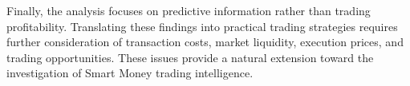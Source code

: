 Finally, the analysis focuses on predictive information rather than trading profitability. Translating these findings into practical trading strategies requires further consideration of transaction costs, market liquidity, execution prices, and trading opportunities. These issues provide a natural extension toward the investigation of Smart Money trading intelligence.
